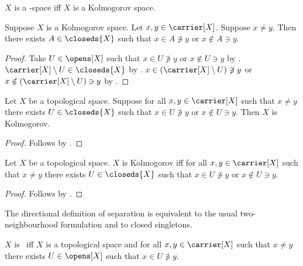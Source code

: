 \begin{abbreviation}\label{teezero_space}
    $X$ is a \teezero-space iff $X$ is a Kolmogorov space.
\end{abbreviation}

\begin{proposition}\label{kolmogorov_implies_kolmogorov_for_closeds}
    Suppose $X$ is a Kolmogorov space.
    Let $x,y\in\carrier[X]$.
    Suppose $x\neq y$.
    Then there exists $A\in\closeds{X}$ such that
        $x\in A\not\ni y$ or $x\notin A\ni y$.
\end{proposition}
\begin{proof}
    Take $U\in\opens[X]$ such that
        $x\in U\not\ni y$ or $x\notin U\ni y$
        by .
    $\carrier[X]\setminus U\in\closeds{X}$
        by .
    $x\in(\carrier[X]\setminus U)\not\ni y$ or
        $x\notin(\carrier[X]\setminus U)\ni y$
        by .
\end{proof}

\begin{proposition}\label{kolmogorov_for_closeds_implies_kolmogorov}
    Let $X$ be a topological space.
    Suppose for all $x,y\in\carrier[X]$ such that $x\neq y$
        there exists $U\in\closeds{X}$ such that
        $x\in U\not\ni y$ or $x\notin U\ni y$.
    Then $X$ is Kolmogorov.
\end{proposition}
\begin{proof}
    Follows by .
\end{proof}

\begin{proposition}\label{kolmogorov_iff_kolmogorov_for_closeds}
    Let $X$ be a topological space.
    $X$ is Kolmogorov iff for all $x,y\in\carrier[X]$ such that
        $x\neq y$ there exists $U\in\closeds{X}$ such that
        $x\in U\not\ni y$ or $x\notin U\ni y$.
\end{proposition}
\begin{proof}
    Follows by
        .
\end{proof}

The directional definition of \teeone separation is equivalent to the usual
two-neighbourhood formulation and to closed singletons.

\begin{definition}\label{teeone}
    $X$ is \teeone\ iff $X$ is a topological space and
        for all $x,y\in\carrier[X]$ such that
            $x\neq y$ there exists $U\in\opens[X]$ such that
            $x\in U\not\ni y$.
\end{definition}

